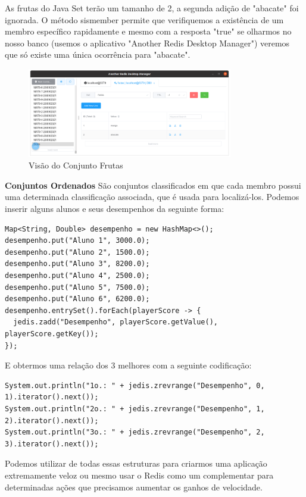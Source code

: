 As frutas do Java Set terão um tamanho de 2, a segunda adição de "abacate" foi ignorada. O método sismember permite que verifiquemos a existência de um membro específico rapidamente e mesmo com a resposta "true" se olharmos no nosso banco (usemos o aplicativo "Another Redis Desktop Manager") veremos que só existe uma única ocorrência para "abacate".
\begin{figure}[H]
	\centering
	\includegraphics[width=0.8\textwidth]{imagens/frutas}
	\caption{Visão do Conjunto Frutas}
\end{figure}

\textbf{Conjuntos Ordenados}
São conjuntos classificados em que cada membro possui uma determinada classificação associada, que é usada para localizá-los. Podemos inserir alguns alunos e seus desempenhos da seguinte forma:
\begin{lstlisting}[]
Map<String, Double> desempenho = new HashMap<>();
desempenho.put("Aluno 1", 3000.0);
desempenho.put("Aluno 2", 1500.0);
desempenho.put("Aluno 3", 8200.0);
desempenho.put("Aluno 4", 2500.0);
desempenho.put("Aluno 5", 7500.0);
desempenho.put("Aluno 6", 6200.0);
desempenho.entrySet().forEach(playerScore -> {
  jedis.zadd("Desempenho", playerScore.getValue(), playerScore.getKey());
});	
\end{lstlisting}

E obtermos uma relação dos 3 melhores com a seguinte codificação:
\begin{lstlisting}[]
System.out.println("1o.: " + jedis.zrevrange("Desempenho", 0, 1).iterator().next());
System.out.println("2o.: " + jedis.zrevrange("Desempenho", 1, 2).iterator().next());
System.out.println("3o.: " + jedis.zrevrange("Desempenho", 2, 3).iterator().next());
\end{lstlisting}

Podemos utilizar de todas essas estruturas para criarmos uma aplicação extremamente veloz ou mesmo usar o Redis como um complementar para determinadas ações que precisamos aumentar os ganhos de velocidade.